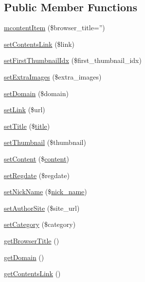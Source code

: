 \subsection*{Public Member Functions}
\begin{DoxyCompactItemize}
\item 
\hyperlink{classmcontentItem_a9cf9b439a6c29b1354b298ab6023ea3e}{mcontent\-Item} (\$browser\-\_\-title='')
\item 
\hyperlink{classmcontentItem_a8d8267fc8c63ad032d8dfa694b54d30b}{set\-Contents\-Link} (\$link)
\item 
\hyperlink{classmcontentItem_a97b29510d9386112296071cb06bd68dd}{set\-First\-Thumbnail\-Idx} (\$first\-\_\-thumbnail\-\_\-idx)
\item 
\hyperlink{classmcontentItem_a9907cf978c2b2dafbaeb307faea0874d}{set\-Extra\-Images} (\$extra\-\_\-images)
\item 
\hyperlink{classmcontentItem_adaf816a617e10b21c1b7cfa3080e4a25}{set\-Domain} (\$domain)
\item 
\hyperlink{classmcontentItem_a6c192aee58d7bca3d8933d387309b2ab}{set\-Link} (\$url)
\item 
\hyperlink{classmcontentItem_adb687bee610481753feb8bdd14fab049}{set\-Title} (\$\hyperlink{ko_8install_8php_a5b072c5fd1d2228c6ba5cee13cd142e3}{title})
\item 
\hyperlink{classmcontentItem_a956c763f26136b4e7a96ab07c04a1957}{set\-Thumbnail} (\$thumbnail)
\item 
\hyperlink{classmcontentItem_afb9763a013942bd40ab5a3b1c7491910}{set\-Content} (\$\hyperlink{classcontent}{content})
\item 
\hyperlink{classmcontentItem_aeb646f2283bfb0a13b7d9f544058f962}{set\-Regdate} (\$regdate)
\item 
\hyperlink{classmcontentItem_a4b702963538643aac56d9a3312a06bee}{set\-Nick\-Name} (\$\hyperlink{ko_8install_8php_a151ecae87a1f3d7e257aa089803086bd}{nick\-\_\-name})
\item 
\hyperlink{classmcontentItem_adaa9ad60dd8f5373b9f2258a6effe70c}{set\-Author\-Site} (\$site\-\_\-url)
\item 
\hyperlink{classmcontentItem_a004c63ef8da549d29d201b4946372c5e}{set\-Category} (\$category)
\item 
\hyperlink{classmcontentItem_a6fe964acc2f33039f90a6ed33ae03ba9}{get\-Browser\-Title} ()
\item 
\hyperlink{classmcontentItem_a29a4fb4f4bedd748ec93238be37a22fb}{get\-Domain} ()
\item 
\hyperlink{classmcontentItem_a60fe1f5cbd47314c2910a8782a3252a9}{get\-Contents\-Link} ()

\end{DoxyCompactItemize}

